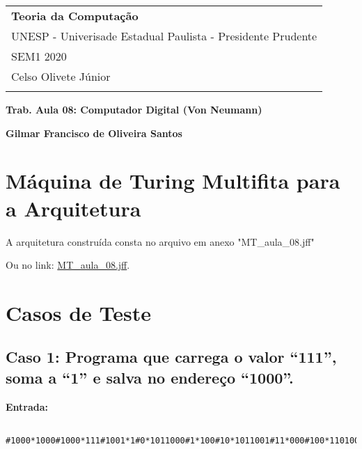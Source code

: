 \documentclass[a4paper,12pt]{article}
\begin{document}
\thispagestyle{empty}

\begin{tabular}{p{15.5cm}}

{\large \bf Teoria da Computação} \\
UNESP - Univerisade Estadual Paulista - Presidente Prudente\\ SEM1 2020  \\Celso Olivete Júnior\\
\hline
\\
\end{tabular}

\vspace*{0.3cm}

\begin{center} %
	{\Large \bf Trab. Aula 08: Computador Digital (Von Neumann)} %
	\vspace{2mm}

	{\bf Gilmar Francisco de Oliveira Santos} %

\end{center}

\vspace{0.4cm}

\section{Máquina de Turing Multifita para a Arquitetura}
A arquitetura construída consta no arquivo em anexo "MT\_aula\_08.jff"

Ou no link: \href{https://github.com/gilmarfrancisco828/Teoria_da_Computacao/blob/master/atividade_aula_08/MT_aula_08.jff}{MT\_aula\_08.jff}.\\


\newpage
\section{Casos de Teste}

\subsection*{Caso 1: Programa que carrega o valor “111”, soma a “1” e salva no endereço “1000”.}

\textbf{Entrada:}
\begin{verbatim}
    #1000*1000#1000*111#1001*1#0*1011000#1*100#10*1011001#11*000#100*1101000#
\end{verbatim}
\end{document}
